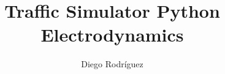 \documentclass{article}
\title{\huge \textbf{Traffic Simulator Python}\\
\Large Electrodynamics}
\author{Diego Rodríguez}
\begin{document}
\newcommand\sol[1]{\begin{center}\fbox{\begin{minipage}{0.95\textwidth}\vspace*{0.25cm}#1\end{minipage}\vspace*{0.5cm}}\end{center}}
\let\oldhat\hat
\let\oldvec\vec
\newcommand{\vect}[1]{\dot{\vec{#1}}}
\newcommand{\vectt}[1]{\ddot{\vec{#1}}}
\newcommand{\vecttt}[1]{\dddot{\vec{#1}}}   
\renewcommand{\vec}[1]{\mathbf{#1}}
\renewcommand{\hat}[1]{\oldhat{\mathbf{#1}}}
\newcommand{\norm}[1]{\left|#1\right|}
\newcommand{\dev}[2]{\frac{d#1}{d#2}}
\newcommand{\devp}[2]{\frac{\partial#1}{\partial#2}}
\newcommand{\devt}[3]{\left(\devp{#1}{#2}\right)_{#3}}
\newcommand{\spur}[1]{\text{Spur}\left(#1\right)}
\renewcommand{\mit}[1]{\left\langle#1\right\rangle}
\newcommand{\Shat}{\oldhat{S}}
\newcommand{\cte}{\text{cte}}
\newcommand{\ten}[1]{\overleftrightarrow{\mathbf{#1}}}
\newtheorem{thm}{Satz}[section]
\theoremstyle{definition}
\newtheorem{pub}[thm]{PÜ}
\newtheorem{hub}[thm]{HÜ}
\newtheorem{prob}[thm]{P}
\maketitle
\end{document}
